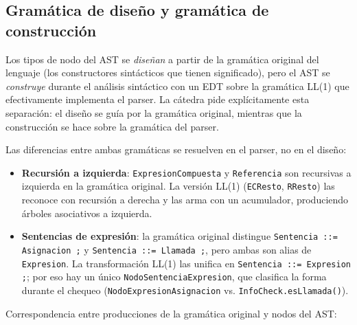 \documentclass[11pt,a4paper]{article}
\begin{document}
\subsection{Gramática de diseño y gramática de construcción}

Los tipos de nodo del AST se \emph{diseñan} a partir de la gramática original del
lenguaje (los constructores sintácticos que tienen significado), pero el AST se
\emph{construye} durante el análisis sintáctico con un EDT sobre la gramática LL(1) que efectivamente implementa el
parser. La cátedra pide explícitamente esta separación: el diseño se guía por la
gramática original, mientras que la construcción se hace sobre la gramática del
parser.

Las diferencias entre ambas gramáticas se resuelven en el parser, no en el diseño:

\begin{itemize}
  \item \textbf{Recursión a izquierda}: \texttt{ExpresionCompuesta} y
        \texttt{Referencia} son recursivas a izquierda en la gramática original.
        La versión LL(1) (\texttt{ECResto}, \texttt{RResto}) las reconoce con
        recursión a derecha y las arma con un acumulador, produciendo árboles
        asociativos a izquierda.
  \item \textbf{Sentencias de expresión}: la gramática original distingue
        \texttt{Sentencia ::= Asignacion ;} y \texttt{Sentencia ::= Llamada ;},
        pero ambas son alias de \texttt{Expresion}. La transformación LL(1) las
        unifica en \texttt{Sentencia ::= Expresion ;}; por eso hay un único
        \texttt{NodoSentenciaExpresion}, que clasifica la forma durante el
        chequeo (\texttt{NodoExpresionAsignacion} vs. \texttt{InfoCheck.esLlamada()}).
\end{itemize}

Correspondencia entre producciones de la gramática original y nodos del AST:
\end{document}
